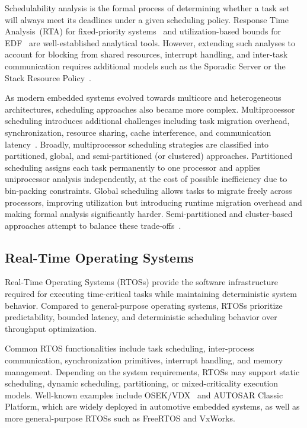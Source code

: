 Schedulability analysis is the formal process of determining
whether a task set will always meet its deadlines under a
given scheduling policy. Response Time Analysis~(RTA) for
fixed-priority systems~\cite{joseph1986} and utilization-based
bounds for EDF~\cite{liu1973} are well-established analytical
tools. However, extending such analyses to account for
blocking from shared resources, interrupt handling, and
inter-task communication requires additional models such as
the Sporadic Server or the Stack Resource Policy~\cite{baker1991}.

As modern embedded systems evolved towards multicore and
heterogeneous architectures, scheduling approaches also became
more complex. Multiprocessor scheduling introduces additional
challenges including task migration overhead, synchronization,
resource sharing, cache interference, and communication
latency~\cite{megel2010}. Broadly, multiprocessor scheduling
strategies are classified into partitioned, global, and
semi-partitioned (or clustered) approaches. Partitioned
scheduling assigns each task permanently to one processor and
applies uniprocessor analysis independently, at the cost of
possible inefficiency due to bin-packing constraints. Global
scheduling allows tasks to migrate freely across processors,
improving utilization but introducing runtime migration
overhead and making formal analysis significantly harder.
Semi-partitioned and cluster-based approaches attempt to
balance these trade-offs~\cite{davis2011}.

\subsection{Real-Time Operating Systems}
\label{subsec:rtos}

Real-Time Operating Systems (RTOSs) provide the software
infrastructure required for executing time-critical tasks
while maintaining deterministic system behavior. Compared to
general-purpose operating systems, RTOSs prioritize
predictability, bounded latency, and deterministic scheduling
behavior over throughput optimization.

Common RTOS functionalities include task scheduling,
inter-process communication, synchronization primitives,
interrupt handling, and memory management. Depending on the
system requirements, RTOSs may support static scheduling,
dynamic scheduling, partitioning, or mixed-criticality
execution models. Well-known examples include
OSEK/VDX~\cite{osek2005} and AUTOSAR Classic Platform, which
are widely deployed in automotive embedded systems, as well as
more general-purpose RTOSs such as FreeRTOS and VxWorks.

